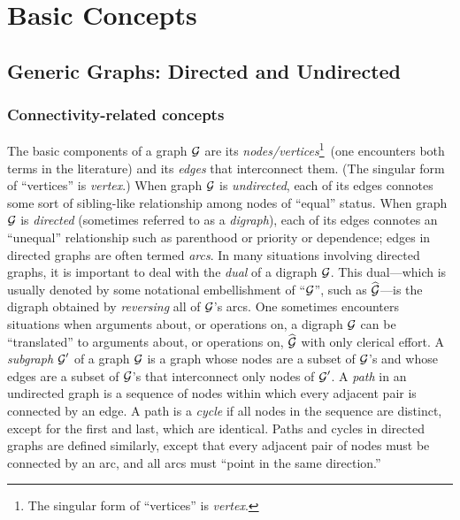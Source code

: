 \section{Basic Concepts}
\label{sec:basic-graphs}

\subsection{Generic Graphs: Directed and Undirected}
\label{sec:graphs-generic}

\subsubsection{Connectivity-related concepts}

The basic components of a graph $\mbox{$\cal G$}$ are 
   its {\em nodes/vertices}\footnote{The singular form of
  ``vertices'' is {\it vertex}.}~(one encounters both terms in the
literature) and its {\em edges}   that interconnect them.  (The singular form of ``vertices''
is {\it vertex}.)   
When graph $\mbox{$\cal G$}$ is {\em undirected},  each of
its edges connotes some sort of sibling-like relationship among nodes
of ``equal'' status.  When graph $\mbox{$\cal G$}$ is {\em directed}
 (sometimes referred to as a {\em digraph}),
  each of its edges connotes an
``unequal'' relationship such as parenthood or priority or dependence;
edges in directed graphs are often termed {\em
  arcs}.  
In many situations involving directed graphs, it is important to
deal with the {\em dual}  of a digraph
$\mbox{$\cal G$}$.  This dual---which is usually denoted by some notational
embellishment of ``$\mbox{$\cal G$}$'', such as $\widehat{\mbox{$\cal G$}}$---is the digraph
obtained by {\em reversing} all of $\mbox{$\cal G$}$'s arcs.  One sometimes
encounters situations when arguments about, or operations on, a
digraph $\mbox{$\cal G$}$ can be ``translated'' to arguments about, or operations
on, $\widehat{\mbox{$\cal G$}}$ with only clerical effort.  A {\em subgraph} $\mbox{$\cal G$}'$
of a graph $\mbox{$\cal G$}$ is a graph whose nodes are a subset of $\mbox{$\cal G$}$'s and
whose edges are a subset of $\mbox{$\cal G$}$'s that interconnect only nodes of
$\mbox{$\cal G$}'$.  A {\em path}   in
an undirected graph is a sequence of nodes within which every adjacent
pair is connected by an edge.  A path is a {\em cycle}
  if all nodes in the
sequence are distinct, except for the first and last, which are
identical.  Paths and cycles in directed graphs are defined similarly,
except that every adjacent pair of nodes must be connected by an arc,
and all arcs must ``point in the same direction.''

